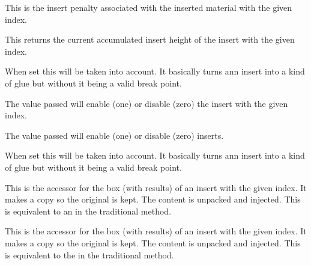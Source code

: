 \stopoldprimitive

\startnewprimitive[title={\prm {insertpenalty}}]

This is the insert penalty associated with the inserted material with the given
index.

\stopnewprimitive

\startnewprimitive[title={\prm {insertprogress}}]

This returns the current accumulated insert height of the insert with the given
index.

\stopnewprimitive

\startnewprimitive[title={\prm {insertshrink}}]

When set this will be taken into account. It basically turns ann insert into a
kind of glue but without it being a valid break point.

\stopnewprimitive

\startnewprimitive[title={\prm {insertstorage}}]

The value passed will enable (one) or disable (zero) the insert with the given
index.

\stopnewprimitive

\startnewprimitive[title={\prm {insertstoring}}]

The value passed will enable (one) or disable (zero) inserts.

\stopnewprimitive

\startnewprimitive[title={\prm {insertstretch}}]

When set this will be taken into account. It basically turns ann insert into a
kind of glue but without it being a valid break point.

\stopnewprimitive

\startnewprimitive[title={\prm {insertunbox}}]

This is the accessor for the box (with results) of an insert with the given
index. It makes a copy so the original is kept. The content is unpacked and
injected. This is equivalent to an  in the traditional method.

\stopnewprimitive

\startnewprimitive[title={\prm {insertuncopy}}]

This is the accessor for the box (with results) of an insert with the given
index. It makes a copy so the original is kept. The content is unpacked and
injected. This is equivalent to the  in the traditional method.

\stopnewprimitive

